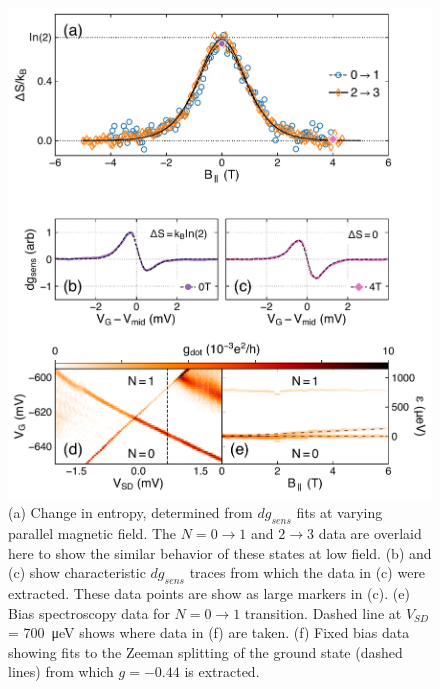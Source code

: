 \documentclass[twocolumn,showpacs,preprintnumbers,amsmath,amssymb,pra,aps,superscriptaddress]{revtex4-1}
\begin{document}
\begin{figure}
        \includegraphics[width=1.0\columnwidth]{../figures/figure_3.pdf}
        \caption{\label{fig:fig3}(a) Change in entropy, determined from $dg_{sens}$ fits at varying parallel magnetic field. The $N=0 \rightarrow 1$ and $2 \rightarrow 3$ data are overlaid here to show the similar behavior of these states at low field. (b) and (c) show characteristic $dg_{sens}$ traces from which the data in (c) were extracted. These data points are show as large markers in (c). (e) Bias spectroscopy data for $N=0 \rightarrow 1$ transition. Dashed line at $V_{SD}$ = \SI{700}{\micro\electronvolt} shows where data in (f) are taken. (f) Fixed bias data showing fits to the Zeeman splitting of the ground state (dashed lines) from which $g = -0.44$ is extracted.}
\end{figure}
\end{document}
